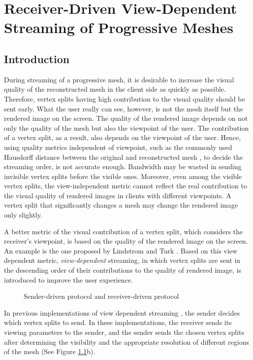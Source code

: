 \chapter{Receiver-Driven View-Dependent Streaming of Progressive Meshes}
\label{c:rdstream}
\section{Introduction}
\label{s:dstream:intro}
    During streaming of a progressive mesh, it is desirable to 
    increase the visual quality of the reconstructed mesh in the client side
    as quickly as possible. 
    Therefore, vertex splits having high contribution to the visual quality
    should be sent early. 
    What the user really can see, however, is not the mesh itself but the rendered
    image on the screen. The quality of the rendered image
    depends on not only the quality of the mesh but also the viewpoint
    of the user. The contribution of a vertex split, as a result, 
    also depends on the viewpoint of the user. 
    Hence, using quality metrics independent of viewpoint,
    such as the commonly used Hausdorff distance between the 
    original and reconstructed mesh \cite{cignoni98metro}, to
    decide the streaming order, is not accurate enough. 
    Bandwidth may be wasted in sending invisible vertex splits
    before the visible ones. Moreover, even among the visible vertex splits,
    the view-independent metric cannot reflect the real contribution to
    the visual quality of rendered images in clients with different viewpoints. 
    A vertex split that significantly changes a mesh may change the rendered image 
    only slightly.

    A better metric of the visual contribution of a vertex split, 
    which considers the receiver's viewpoint, is 
    based on the quality of the rendered image on the screen.
    An example is the one proposed by Lindstrom and Turk \cite{353995}.
    Based on this view dependent metric, \emph{view-dependent} streaming,
    in which vertex splits are sent in the descending order of 
    their contributions to the quality of rendered image, is introduced
    to improve the user experience. 
    
    \begin{figure}
    \centering
    \caption{Sender-driven protocol and receiver-driven protocol 
    \label{dstream:protocol}}
    \end{figure}
    In previous implementations of view dependent streaming
    \cite{To1999, 363375, progressive:Yang, kim:view, zheng:interactive}, 
    the sender decides which vertex splits to send. In these implementations,  
    the receiver sends its viewing parameters to the sender, 
    and the sender sends the chosen vertex splits after
    determining the visibility and the appropriate resolution of 
    different regions of the mesh (See Figure \ref{dstream:protocol}b).

